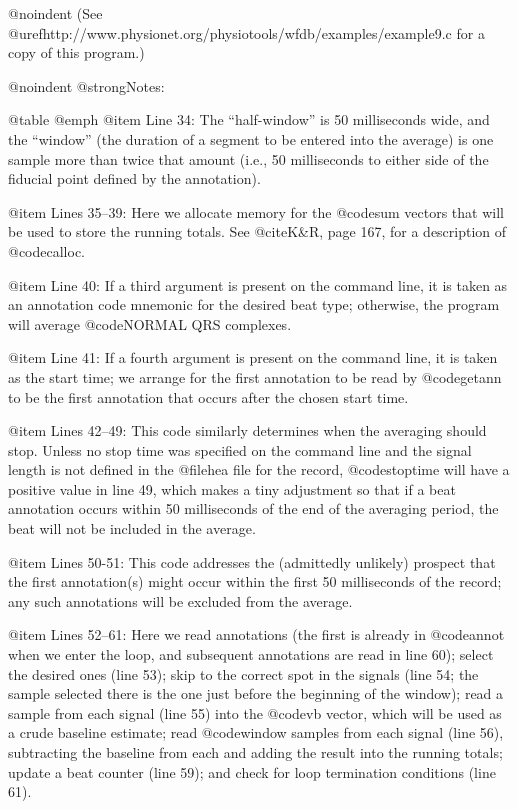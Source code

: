 {{{{{{{{{{@noindent
(See @uref{http://www.physionet.org/physiotools/wfdb/examples/example9.c}
for a copy of this program.)

@noindent
@strong{Notes:}

@table @emph
@item Line 34:
The ``half-window'' is 50 milliseconds wide, and the ``window'' (the
duration of a segment to be entered into the average) is one sample more
than twice that amount (i.e., 50 milliseconds to either side of the
fiducial point defined by the annotation).

@item Lines 35--39:
Here we allocate memory for the @code{sum} vectors that will be used to
store the running totals.  See @cite{K&R}, page 167, for a description
of @code{calloc}.

@item Line 40:
If a third argument is present on the command line, it is taken as an
annotation code mnemonic for the desired beat type;  otherwise, the
program will average @code{NORMAL} QRS complexes.

@item Line 41:
If a fourth argument is present on the command line, it is taken as the
start time; we arrange for the first annotation to be read by
@code{getann} to be the first annotation that occurs after the chosen
start time.

@item Lines 42--49:
This code similarly determines when the averaging should stop.  Unless
no stop time was specified on the command line and the signal length is
not defined in the @file{hea} file for the record, @code{stoptime}
will have a positive value in line 49, which makes a tiny adjustment so
that if a beat annotation occurs within 50 milliseconds of the end of the
averaging period, the beat will not be included in the average.

@item Lines 50-51:
This code addresses the (admittedly unlikely) prospect that the first
annotation(s) might occur within the first 50 milliseconds of the
record; any such annotations will be excluded from the average.

@item Lines 52--61:
Here we read annotations (the first is already in @code{annot} when we
enter the loop, and subsequent annotations are read in line 60); select
the desired ones (line 53); skip to the correct spot in the signals (line
54; the sample selected there is the one just before the beginning of
the window); read a sample from each signal (line 55) into the @code{vb}
vector, which will be used as a crude baseline estimate; read
@code{window} samples from each signal (line 56), subtracting the
baseline from each and adding the result into the running totals; update
a beat counter (line 59); and check for loop termination conditions
(line 61).

}}}}}}}}}}
